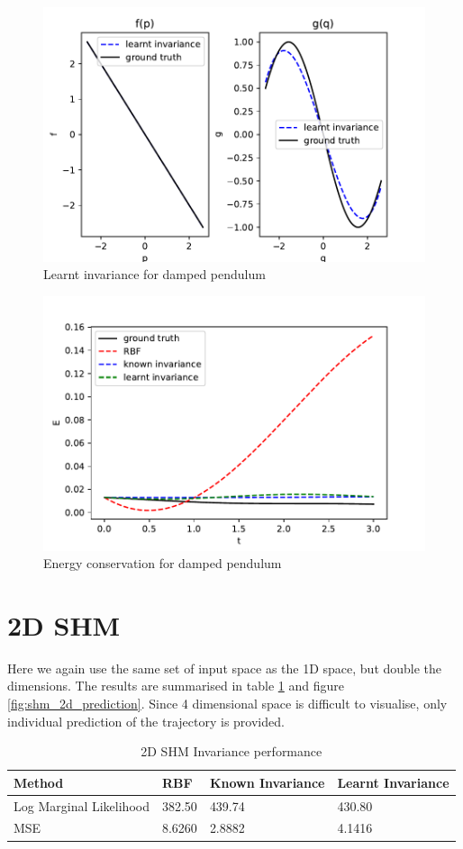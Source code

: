\documentclass{statsmsc}
\begin{document}
\begin{figure}[H] 
  \includegraphics[width=0.6\linewidth]{../codes/figures/damped_pendulum_learnt.pdf}
  \centering
  \caption{Learnt invariance for damped pendulum}
  \label{fig:damped_pendulum_learnt}
\end{figure}

\begin{figure}[H] 
  \includegraphics[width=0.6\linewidth]{../codes/figures/damped_pendulum_energy.pdf}
  \centering
  \caption{Energy conservation for damped pendulum}
  \label{fig:damped_pendulum_energy}
\end{figure}



\section{2D SHM}
Here we again use the same set of input space as the 1D space, but double the dimensions. 
The results are summarised in table \ref{tab:SHM_2d_performance} and figure \ref{fig:shm_2d_prediction}.
Since 4 dimensional space is difficult to visualise, only individual prediction of the trajectory is provided. 
\begin{table}[H]
  \centering
  \begin{tabular}{l l l l}
    \hline
Method           & RBF & Known Invariance&  Learnt Invariance\\
  \hline
Log Marginal Likelihood & 382.50 & 439.74 & 430.80  \\
MSE & 8.6260 & 2.8882 & 4.1416 \\
                    \hline
  \end{tabular}
  \caption{2D SHM Invariance performance}
  \label{tab:SHM_2d_performance}
\end{table}
\end{document}
